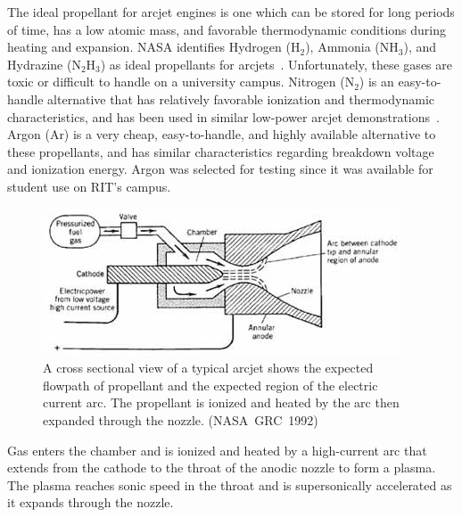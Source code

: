 \documentclass[journal]{IEEEtran}
\begin{document}
The ideal propellant for arcjet engines is one which can be stored for long periods of time, has a low atomic mass, and favorable thermodynamic conditions during heating and expansion.
NASA identifies Hydrogen (H$_{2}$), Ammonia (NH$_{3}$), and Hydrazine (N$_{2}$H$_{3}$) as ideal propellants for arcjets~\cite{nasa1992considerations}.
Unfortunately, these gases are toxic or difficult to handle on a university campus.
Nitrogen (N$_{2}$) is an easy-to-handle alternative that has relatively favorable ionization and thermodynamic characteristics, and has been used in similar low-power arcjet demonstrations~\cite{olin2012report,olin2012sim}.
Argon (Ar) is a very cheap, easy-to-handle, and highly available alternative to these propellants, and has similar characteristics regarding breakdown voltage and ionization energy.
Argon was selected for testing since it was available for student use on RIT's campus.
\begin{figure}[htp]
  \centering
  \includegraphics[width=\linewidth]{figs/cross-section_nasa}
  \caption[Arcjet cross-section]{A cross sectional view of a typical arcjet shows the expected flowpath of propellant and the expected region of the electric current arc. The propellant is ionized and heated by the arc then expanded through the nozzle. (NASA~GRC~1992)
\label{fig:x-section-nasa}
}
\end{figure}

Gas enters the chamber and is ionized and heated by a high-current arc that extends from the cathode to the throat of the anodic nozzle to form a plasma.
The plasma reaches sonic speed in the throat and is supersonically accelerated as it expands through the nozzle.
\end{document}
